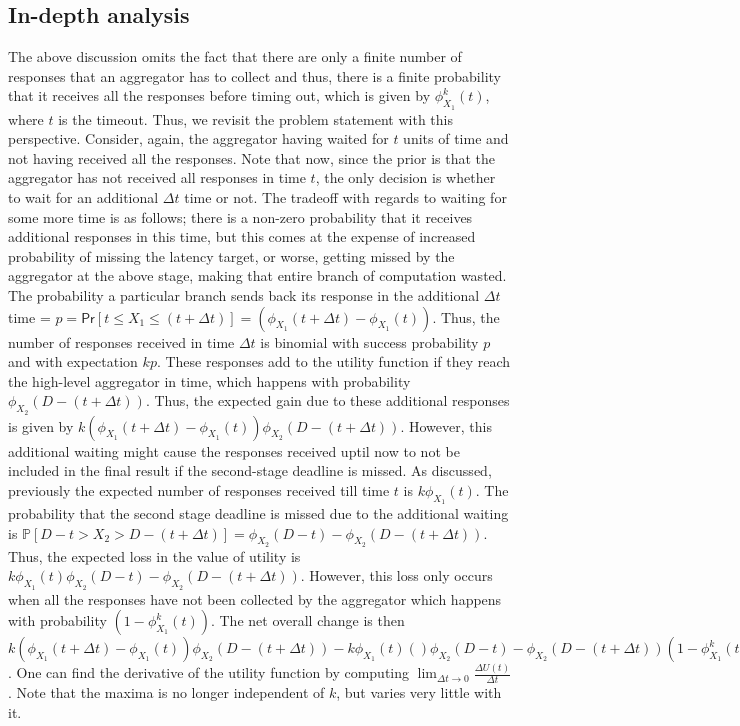 \documentclass[letterpaper,twocolumn,10pt]{article}
\begin{document}
\subsection{In-depth analysis}
The above discussion omits the fact that there are only a finite number of responses that an
aggregator has to collect and thus, there is a finite probability that it receives all the
responses before timing out, which is given by $\phi_{X_1}^{k}(t)$, where $t$ is the timeout. Thus, we revisit the problem statement with this perspective.
Consider, again, the aggregator having waited for $t$ units of time and not having received 
all the responses.
Note that now, since the prior is that the aggregator has not received all responses in time $t$, the only decision is whether to wait for an additional $\Delta t$ time or not.
The tradeoff with regards to waiting for some more time is as follows; 
there is a non-zero probability that it receives additional responses in this time, 
but this comes at the expense of increased probability of missing the latency target,
 or worse, getting missed by the aggregator at the above stage, 
making that entire branch of computation wasted.
The probability a particular branch sends back its response in the 
additional $\Delta t$ time = $p = \textsf{Pr}[t \leq X_1 \leq (t + \Delta t)] = (\phi_{X_1}(t + \Delta t) - \phi_{X_1}(t))$. 
Thus, the number of responses received in time $\Delta t$ is 
binomial with success probability $p$ and with expectation $kp$. 
These responses add to the utility function if they reach the high-level aggregator in time, which happens with probability $\phi_{X_2}(D - (t + \Delta t))$. 
Thus, the expected gain due to these additional responses is given by $k(\phi_{X_1}(t + \Delta t) - \phi_{X_1}(t))\phi_{X_2}(D - (t + \Delta t))$.
However, this additional waiting might cause the responses received uptil now to 
not be included in the final result if the second-stage deadline is missed. As discussed, previously the expected number of responses received till time $t$ is $k\phi_{X_1}(t)$. 
The probability that the second stage deadline is missed due to the additional waiting
is $\mathbb{P}[D - t > X_2 > D - (t + \Delta t)] = \phi_{X_2}(D - t) - \phi_{X_2}(D - (t + \Delta t))$. Thus, the expected loss in the value of utility is $k\phi_{X_1}(t)\phi_{X_2}(D - t) - \phi_{X_2}(D - (t + \Delta t))$. However, this loss only occurs when all the responses have not been collected by the aggregator which happens with probability $(1 - \phi_{X_1}^{k}(t))$.
The net overall change is then $k(\phi_{X_1}(t + \Delta t) - \phi_{X_1}(t))\phi_{X_2}(D - (t + \Delta t)) - k\phi_{X_1}(t)()\phi_{X_2}(D - t) - \phi_{X_2}(D - (t + \Delta t))(1 - \phi_{X_1}^{k}(t))$.
One can find the derivative of the utility function by computing $\lim_{\Delta t \to 0} \frac{\Delta U(t)}{\Delta t}$. Note that the maxima is no longer independent of $k$, but varies very little with it. 
\end{document}
